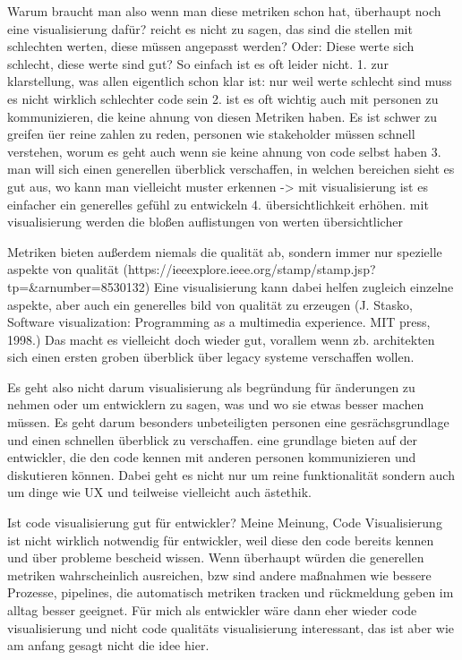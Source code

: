 Warum braucht man also wenn man diese metriken schon hat, überhaupt noch eine visualisierung dafür?
reicht es nicht zu sagen, das sind die stellen mit schlechten werten, diese müssen angepasst werden? Oder: Diese werte sich schlecht, diese werte sind gut?
So einfach ist es oft leider nicht. 
1. zur klarstellung, was allen eigentlich schon klar ist: nur weil werte schlecht sind muss es nicht wirklich schlechter code sein
2. ist es oft wichtig auch mit personen zu kommunizieren, die keine ahnung von diesen Metriken haben. Es ist schwer zu greifen üer reine zahlen zu reden, personen wie stakeholder müssen schnell verstehen, worum es geht auch wenn sie keine ahnung von code selbst haben
3. man will sich einen generellen überblick verschaffen, in welchen bereichen sieht es gut aus, wo kann man vielleicht muster erkennen -> mit visualisierung ist es einfacher ein generelles gefühl zu entwickeln
4. übersichtlichkeit erhöhen. mit visualisierung werden die bloßen auflistungen von werten übersichtlicher


Metriken bieten außerdem niemals die qualität ab, sondern immer nur spezielle aspekte von qualität (https://ieeexplore.ieee.org/stamp/stamp.jsp?tp=&arnumber=8530132)
Eine visualisierung kann dabei helfen zugleich einzelne aspekte, aber auch ein generelles bild von qualität zu erzeugen (J. Stasko, Software visualization: Programming as a multimedia experience. MIT press, 1998.)
Das macht es vielleicht doch wieder gut, vorallem wenn zb. architekten sich einen ersten groben überblick über legacy systeme verschaffen wollen.

Es geht also nicht darum visualisierung als begründung für änderungen zu nehmen oder um entwicklern zu sagen, was und wo sie etwas besser machen müssen.
Es geht darum besonders unbeteiligten personen eine gesrächsgrundlage und einen schnellen überblick zu verschaffen. eine grundlage bieten auf der entwickler, die den code kennen mit anderen personen kommunizieren und diskutieren können. Dabei geht es nicht nur um reine funktionalität sondern auch um dinge wie UX und teilweise vielleicht auch ästethik.


Ist code visualisierung gut für entwickler?
Meine Meinung, Code Visualisierung ist nicht wirklich notwendig für entwickler, weil diese den code bereits kennen und über probleme bescheid wissen. Wenn überhaupt würden die generellen metriken wahrscheinlich ausreichen, bzw sind andere maßnahmen wie bessere Prozesse, pipelines, die automatisch metriken tracken und rückmeldung geben im alltag besser geeignet.
Für mich als entwickler wäre dann eher wieder code visualisierung und nicht code qualitäts visualisierung interessant, das ist aber wie am anfang gesagt nicht die idee hier.

